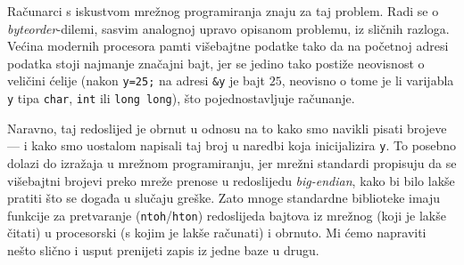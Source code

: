 Računarci s iskustvom mrežnog programiranja znaju za taj problem. Radi se o \emph{byteorder}-dilemi, sasvim analognoj upravo opisanom problemu, iz sličnih razloga. Većina modernih procesora pamti višebajtne podatke tako da na početnoj adresi podatka stoji najmanje značajni bajt, jer se jedino tako postiže neovisnost o veličini ćelije %
(nakon \texttt{y=25;} na adresi \texttt{\&y} je bajt $25$, neovisno o tome je li varijabla \texttt y tipa \texttt{char}, \texttt{int} ili \texttt{long~long}), što pojednostavljuje računanje. %

Naravno, taj redoslijed je obrnut u odnosu na to kako smo navikli pisati brojeve --- i kako smo uostalom napisali taj broj u naredbi koja inicijalizira \texttt y. To posebno dolazi do izražaja u mrežnom programiranju, jer mrežni standardi propisuju da se višebajtni brojevi preko mreže prenose u redoslijedu \emph{big-endian}, kako bi bilo lakše pratiti što se događa u slučaju greške. Zato mnoge standardne biblioteke imaju funkcije za pretvaranje (\texttt{ntoh}/\texttt{hton}) redoslijeda bajtova iz mrežnog (koji je lakše čitati) u procesorski (s kojim je lakše računati) i obrnuto. Mi ćemo napraviti nešto slično i usput prenijeti zapis iz jedne baze u drugu.

